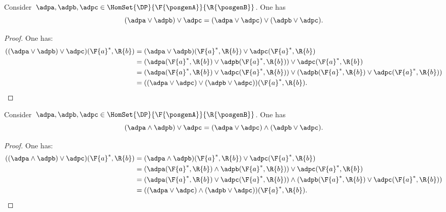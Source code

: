 {\begin{lemma}
    \label{lem:vee_vee}
    Consider~$\adpa,\adpb,\adpc\in \HomSet{\DP}{\F{\posgenA}}{\R{\posgenB}}$. One has
    \begin{equation*}
        (\adpa \vee \adpb)\vee \adpc=(\adpa \vee \adpc) \vee (\adpb\vee \adpc).
    \end{equation*}
\end{lemma}
\begin{proof}
    One has:
    \begin{equation*}
        \begin{aligned}
            ((\adpa \vee \adpb)\vee \adpc)(\F{a}^*,\R{b})&=
            (\adpa \vee \adpb)(\F{a}^*,\R{b})\vee \adpc(\F{a}^*,\R{b})\\
            &=(\adpa(\F{a}^*,\R{b}) \vee \adpb(\F{a}^*,\R{b}))\vee \adpc(\F{a}^*,\R{b})\\
            &=(\adpa(\F{a}^*,\R{b}) \vee  \adpc(\F{a}^*,\R{b})) \vee (\adpb(\F{a}^*,\R{b})\vee \adpc(\F{a}^*,\R{b}))\\
            &=((\adpa \vee \adpc) \vee (\adpb\vee \adpc))(\F{a}^*,\R{b}).
        \end{aligned}
    \end{equation*}
\end{proof}

\begin{lemma}
    \label{lem:vee_wedge}
    Consider~$\adpa,\adpb,\adpc\in \HomSet{\DP}{\F{\posgenA}}{\R{\posgenB}}$. One has
    \begin{equation*}
        (\adpa \wedge \adpb)\vee \adpc=(\adpa \vee \adpc) \wedge (\adpb\vee \adpc).
    \end{equation*}
\end{lemma}
\begin{proof}
    One has:
    \begin{equation*}
        \begin{aligned}
            ((\adpa \wedge \adpb)\vee \adpc)(\F{a}^*,\R{b})&=
            (\adpa \wedge \adpb)(\F{a}^*,\R{b})\vee \adpc(\F{a}^*,\R{b})\\
            &=(\adpa(\F{a}^*,\R{b}) \wedge \adpb(\F{a}^*,\R{b}))\vee \adpc(\F{a}^*,\R{b})\\
            &=(\adpa(\F{a}^*,\R{b}) \vee  \adpc(\F{a}^*,\R{b})) \wedge (\adpb(\F{a}^*,\R{b})\vee \adpc(\F{a}^*,\R{b}))\\
            &=((\adpa \vee \adpc) \wedge (\adpb\vee \adpc))(\F{a}^*,\R{b}).
        \end{aligned}
    \end{equation*}
\end{proof}


}
